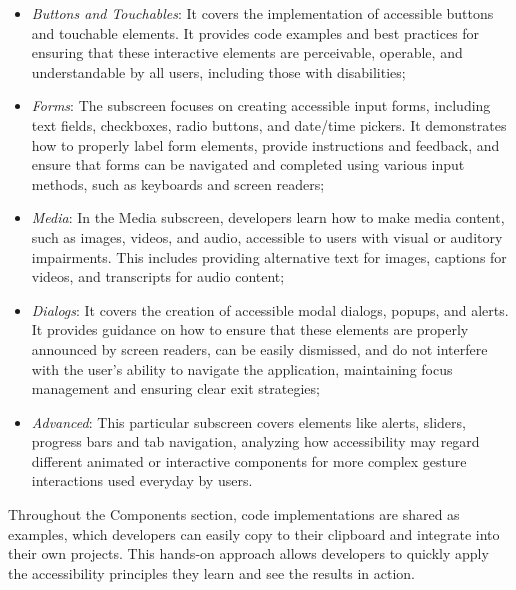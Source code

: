 \begin{enumerate}
    \begin{itemize}
        \item \textit{Buttons and Touchables}: It covers the implementation of accessible buttons and touchable elements. It provides code examples and best practices for ensuring that these interactive elements are perceivable, operable, and understandable by all users, including those with disabilities;

        \item \textit{Forms}: The subscreen focuses on creating accessible input forms, including text fields, checkboxes, radio buttons, and date/time pickers. It demonstrates how to properly label form elements, provide instructions and feedback, and ensure that forms can be navigated and completed using various input methods, such as keyboards and screen readers;

        \item \textit{Media}: In the Media subscreen, developers learn how to make media content, such as images, videos, and audio, accessible to users with visual or auditory impairments. This includes providing alternative text for images, captions for videos, and transcripts for audio content;

        \item \textit{Dialogs}: It covers the creation of accessible modal dialogs, popups, and alerts. It provides guidance on how to ensure that these elements are properly announced by screen readers, can be easily dismissed, and do not interfere with the user's ability to navigate the application, maintaining focus management and ensuring clear exit strategies;

       \item \textit{Advanced}: This particular subscreen covers elements like alerts, sliders, progress bars and tab navigation, analyzing how accessibility may regard different animated or interactive components for more complex gesture interactions used everyday by users.
    \end{itemize}

Throughout the Components section, code implementations are shared as examples, which developers can easily copy to their clipboard and integrate into their own projects. This hands-on approach allows developers to quickly apply the accessibility principles they learn and see the results in action.


\end{enumerate}
